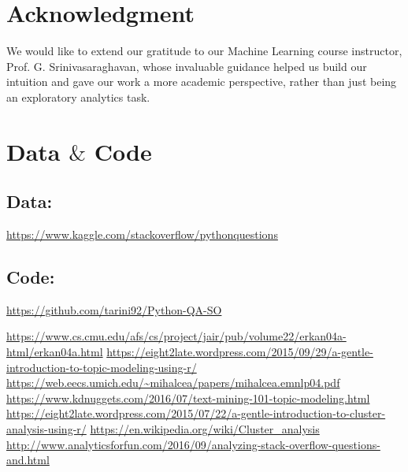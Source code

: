 \documentclass[journal]{IEEEtran}
\begin{document}
\section*{Acknowledgment}
We would like to extend our gratitude to our Machine Learning course instructor, Prof. G. Srinivasaraghavan, whose invaluable guidance helped us build our intuition and gave our work a more academic perspective, rather than just being an exploratory analytics task.


\ifCLASSOPTIONcaptionsoff
  \newpage
\fi

\section{Data $\&$ Code}
\subsection{Data:} \url{https://www.kaggle.com/stackoverflow/pythonquestions}
\subsection{Code:} \url{https://github.com/tarini92/Python-QA-SO}

\begin{thebibliography}{1}
\url{https://www.cs.cmu.edu/afs/cs/project/jair/pub/volume22/erkan04a-html/erkan04a.html}
\url{https://eight2late.wordpress.com/2015/09/29/a-gentle-introduction-to-topic-modeling-using-r/}
\url{https://web.eecs.umich.edu/~mihalcea/papers/mihalcea.emnlp04.pdf}
\url{https://www.kdnuggets.com/2016/07/text-mining-101-topic-modeling.html}
\url{https://eight2late.wordpress.com/2015/07/22/a-gentle-introduction-to-cluster-analysis-using-r/}
\url{https://en.wikipedia.org/wiki/Cluster_analysis}
\url{http://www.analyticsforfun.com/2016/09/analyzing-stack-overflow-questions-and.html}

\end{thebibliography}
\end{document}
